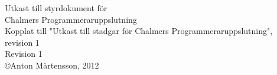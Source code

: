 \documentclass[a4paper]{article}
\begin{document}
\begin{center}
	{\Huge Utkast till styrdokument för} \\[0.5em]
	{\Huge Chalmers Programmeraruppslutning} \\[1em]
	{Kopplat till "Utkast till stadgar för Chalmers Programmeraruppslutning", revision 1} \\[1em]
	{Revision 1} \\
	{\copyright Anton Mårtensson, 2012}
\end{center}

\end{document}
